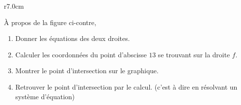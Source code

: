 
\begin{exercice}\label{exosmath-0229}

\begin{wrapfigure}{r}{7.0cm}
            \vspace{-1cm}        %
                \centering
                    
                \end{wrapfigure}

        À propos de la figure ci-contre, 
        \begin{enumerate}
            \item
                Donner les équations des deux droites.
            \item
                Calculer les coordonnées du point d'abscisse \( 13\) se trouvant sur la droite \( f\).
            \item
                Montrer le point d'intersection sur le graphique.
            \item
                Retrouver le point d'intersection par le calcul. (c'est à dire en résolvant un système d'équation)
        \end{enumerate}

\end{exercice}
